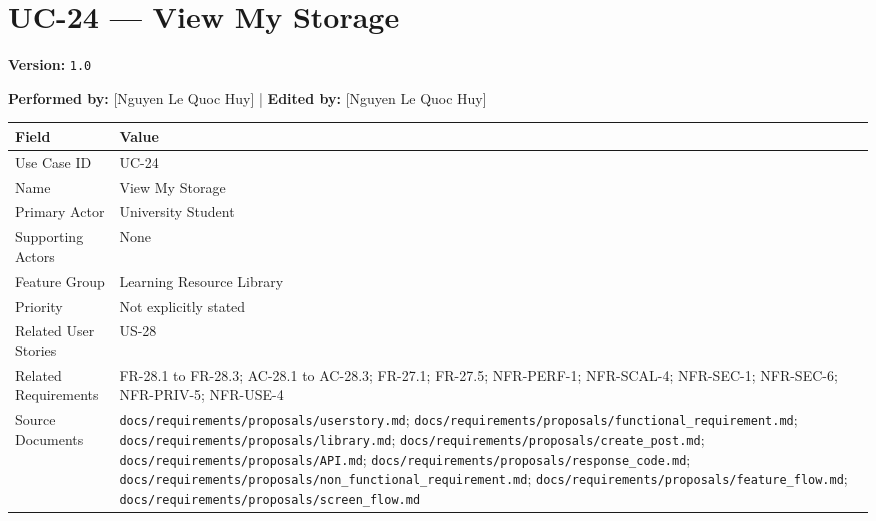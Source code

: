 \documentclass[12pt]{article}
\renewcommand{\baselinestretch}{1.5}
\begin{document}
\pagebreak
\hypertarget{sec:uc-24-view-my-storage}{}
\section*{UC-24 --- View My Storage}
\par\medskip

\textbf{Version:} \texttt{1.0}
\par\medskip

\textbf{Performed by:} [Nguyen Le Quoc Huy] | \textbf{Edited by:} [Nguyen Le Quoc Huy]
\par\medskip

\begingroup
\small
\renewcommand{\baselinestretch}{1.0}\selectfont
\renewcommand{\arraystretch}{1.15}
\setlength{\tabcolsep}{6pt}
\begin{longtable}{|>{\raggedright\arraybackslash}p{}|>{\raggedright\arraybackslash}p{}|}
\hline
\textbf{Field} & \textbf{Value} \\ \hline
\endhead
Use Case ID & UC-24 \\ \hline
Name & View My Storage \\ \hline
Primary Actor & University Student \\ \hline
Supporting Actors & None \\ \hline
Feature Group & Learning Resource Library \\ \hline
Priority & Not explicitly stated \\ \hline
Related User Stories & US-28 \\ \hline
Related Requirements & FR-28.1 to FR-28.3; AC-28.1 to AC-28.3; FR-27.1; FR-27.5; NFR-PERF-1; NFR-SCAL-4; NFR-SEC-1; NFR-SEC-6; NFR-PRIV-5; NFR-USE-4 \\ \hline
Source Documents & \texttt{docs/requirements/proposals/userstory.md}; \texttt{docs/requirements/proposals/functional\_requirement.md}; \texttt{docs/requirements/proposals/library.md}; \texttt{docs/requirements/proposals/create\_post.md}; \texttt{docs/requirements/proposals/API.md}; \texttt{docs/requirements/proposals/response\_code.md}; \texttt{docs/requirements/proposals/non\_functional\_requirement.md}; \texttt{docs/requirements/proposals/feature\_flow.md}; \texttt{docs/requirements/proposals/screen\_flow.md} \\ \hline
\end{longtable}
\endgroup
\par\medskip

\hypertarget{sec:part-a-use-case-model}{}
\end{document}
